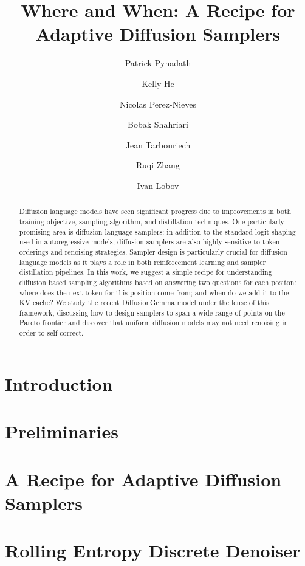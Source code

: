 \documentclass[11pt, a4paper, logo, copyright, gdm]{google}
\title{Where and When: A Recipe for Adaptive Diffusion Samplers}
\author[1,*]{Patrick Pynadath}
\author[2,*]{Kelly He}
\author[ ]{Nicolas Perez-Nieves}
\author[3]{Bobak Shahriari}
\author[3]{Jean Tarbouriech}
\author[1]{Ruqi Zhang}
\author[*]{Ivan Lobov}
\affil[1]{Purdue University}
\affil[2]{Carnegie Mellon University}
\affil[3]{Google DeepMind}
\affil[*]{Work done while at Google DeepMind.}
\begin{document}
\newcommand{\algname}{Rolling Entropy Discrete Denoiser }
\newcommand{\algabbrev}{REED}

\begin{abstract}
Diffusion language models have seen significant progress due to improvements in both training objective, sampling algorithm, and distillation techniques.
One particularly promising area is diffusion language samplers: in addition to the standard logit shaping used in autoregressive models, diffusion samplers are also highly sensitive to token orderings and renoising strategies.
Sampler design is particularly crucial for diffusion language models as it plays a role in both reinforcement learning and sampler distillation pipelines.
In this work, we suggest a simple recipe for understanding diffusion based sampling algorithms based on answering two questions for each positon: where does the next token for this position come from; and when do we add it to the KV cache?
We study the recent DiffusionGemma model under the lense of this framework, discussing how to design samplers to span a wide range of points on the Pareto frontier and discover that uniform diffusion models may not need renoising in order to self-correct.
\end{abstract}

\maketitle

\section{Introduction}
\label{sec:intro}


\section{Preliminaries}
\label{sec:prelims}


\section{A Recipe for Adaptive Diffusion Samplers}

\label{sec:motivation}


\section{\algname}
\label{sec:method}

\end{document}
